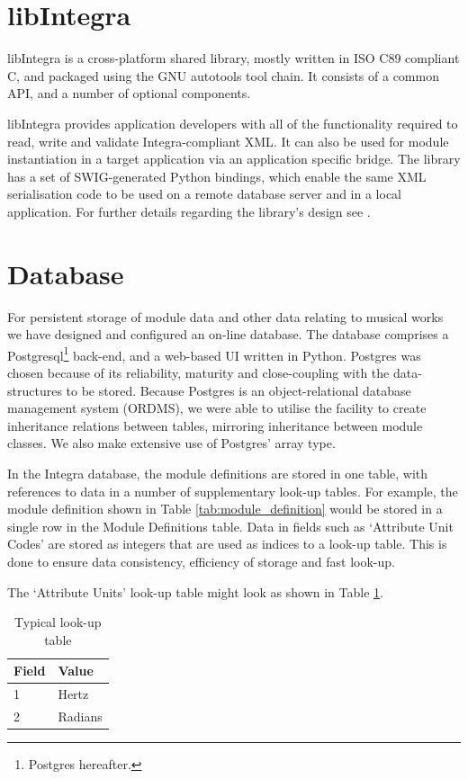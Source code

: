 \documentclass[10pt,journal,final]{IEEEtran}
\newcommand\T{\rule{0pt}{2.6ex}}
\newcommand\B{\rule[-1.2ex]{0pt}{0pt}}
\begin{document}
\section{libIntegra}\label{subsec:db_lib}

libIntegra\cite{bullockfrisk:01} is a cross-platform shared library, mostly written in ISO C89 compliant C, and packaged using the GNU autotools tool chain. It consists of a common API, and a number of optional components.

libIntegra provides application developers with all of the functionality required to read, write and validate Integra-compliant XML. It can also be used for module instantiation in a target application via an application specific bridge. The library has a set of SWIG-generated Python bindings, which enable the same XML serialisation code to be used on a remote database server and in a local application. For further details regarding the library's design see \cite{bullockfrisk:01}.

\section{Database}\label{sec:database}

For persistent storage of module data and other data relating to musical works we have designed and configured an on-line database. The database comprises a Postgresql\footnote{Postgres hereafter.} back-end, and a web-based UI written in Python. Postgres was chosen because of its reliability, maturity and close-coupling with the data-structures to be stored. Because Postgres is an object-relational database management system (ORDMS), we were able to utilise the facility to create inheritance relations between tables, mirroring inheritance between module classes. We also make extensive use of Postgres' array type.

In the Integra database, the module definitions are stored in one table, with references to data in a number of supplementary look-up tables. For example, the module definition shown in Table \ref{tab:module_definition} would be stored in a single row in the Module Definitions table. Data in fields such as `Attribute Unit Codes' are stored as integers that are used as indices to a look-up table. This is done to ensure data consistency, efficiency of storage and fast look-up.

The `Attribute Units' look-up table might look as shown in Table \ref{tab:lookup_table}.

\begin{table} 
\caption{Typical look-up table}
\begin{center}
\begin{tabular}{|l|l|}
\hline
\textbf{Field} \T \B & \textbf{Value} \\
\hline
1 & Hertz \T \\
\hline
2 & Radians \T \\
\hline
\end{tabular} 
\end{center}
\label{tab:lookup_table}
\end{table}
\end{document}
